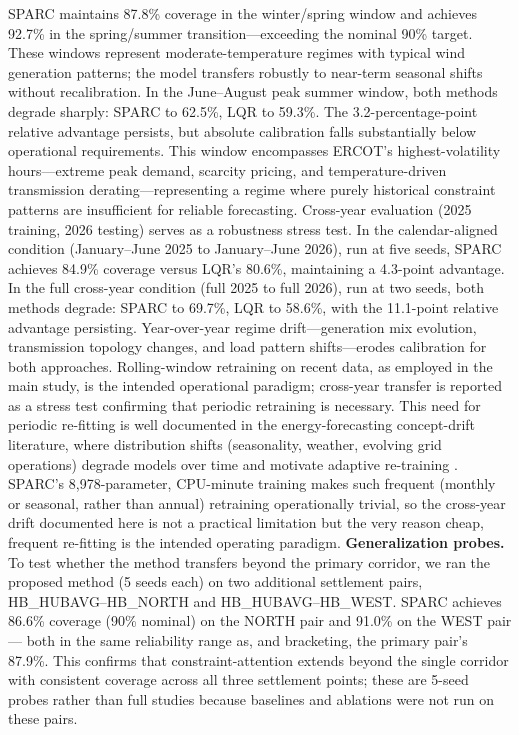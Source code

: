 \documentclass[twoside]{article}
\begin{document}
SPARC maintains 87.8\% coverage in the winter/spring window and achieves 92.7\% in the spring/summer transition---exceeding the nominal 90\% target. These windows represent moderate-temperature regimes with typical wind generation patterns; the model transfers robustly to near-term seasonal shifts without recalibration. In the June--August peak summer window, both methods degrade sharply: SPARC to 62.5\%, LQR to 59.3\%. The 3.2-percentage-point relative advantage persists, but absolute calibration falls substantially below operational requirements. This window encompasses ERCOT's highest-volatility hours---extreme peak demand, scarcity pricing, and temperature-driven transmission derating---representing a regime where purely historical constraint patterns are insufficient for reliable forecasting.
Cross-year evaluation (2025 training, 2026 testing) serves as a robustness stress test. In the calendar-aligned condition (January--June 2025 to January--June 2026), run at five seeds, SPARC achieves 84.9\% coverage versus LQR's 80.6\%, maintaining a 4.3-point advantage. In the full cross-year condition (full 2025 to full 2026), run at two seeds, both methods degrade: SPARC to 69.7\%, LQR to 58.6\%, with the 11.1-point relative advantage persisting. Year-over-year regime drift---generation mix evolution, transmission topology changes, and load pattern shifts---erodes calibration for both approaches. Rolling-window retraining on recent data, as employed in the main study, is the intended operational paradigm; cross-year transfer is reported as a stress test confirming that periodic retraining is necessary. This need for periodic re-fitting is well documented in the energy-forecasting concept-drift literature, where distribution shifts (seasonality, weather, evolving grid operations) degrade models over time and motivate adaptive re-training \cite{hilger2023normalizing}. SPARC's 8,978-parameter, CPU-minute training makes such frequent (monthly or seasonal, rather than annual) retraining operationally trivial, so the cross-year drift documented here is not a practical limitation but the very reason cheap, frequent re-fitting is the intended operating paradigm.
\textbf{Generalization probes.} To test whether the method transfers beyond the primary corridor, we ran the proposed method (5 seeds each) on two additional settlement pairs, HB\_HUBAVG--HB\_NORTH and HB\_HUBAVG--HB\_WEST. SPARC achieves 86.6\% coverage (90\% nominal) on the NORTH pair and 91.0\% on the WEST pair --- both in the same reliability range as, and bracketing, the primary pair's 87.9\%. This confirms that constraint-attention extends beyond the single corridor with consistent coverage across all three settlement points; these are 5-seed probes rather than full studies because baselines and ablations were not run on these pairs.
\end{document}
